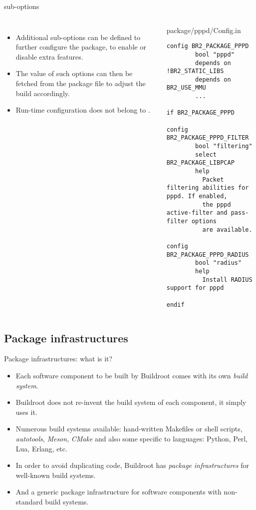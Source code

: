 \begin{frame}[fragile]{ sub-options}
  \begin{columns}
    \begin{itemize}
    \item Additional sub-options can be defined to further configure
      the package, to enable or disable extra features.
    \item The value of such options can then be fetched from the package
       file to adjust the build accordingly.
    \item Run-time configuration does not belong to .
    \end{itemize}
    \begin{block}{package/pppd/Config.in}
      \tiny
\begin{verbatim}
config BR2_PACKAGE_PPPD
        bool "pppd"
        depends on !BR2_STATIC_LIBS
        depends on BR2_USE_MMU
        ...

if BR2_PACKAGE_PPPD

config BR2_PACKAGE_PPPD_FILTER
        bool "filtering"
        select BR2_PACKAGE_LIBPCAP
        help
          Packet filtering abilities for pppd. If enabled,
          the pppd active-filter and pass-filter options
          are available.

config BR2_PACKAGE_PPPD_RADIUS
        bool "radius"
        help
          Install RADIUS support for pppd

endif
\end{verbatim}
    \end{block}
  \end{columns}
\end{frame}

\subsection{Package infrastructures}

\begin{frame}{Package infrastructures: what is it?}
  \begin{itemize}
  \item Each software component to be built by Buildroot comes with
    its own {\em build system}.
  \item Buildroot does not re-invent the build system of each
    component, it simply uses it.
  \item Numerous build systems available: hand-written Makefiles or
    shell scripts, {\em autotools}, {\em Meson}, {\em CMake} and also
    some specific to languages: Python, Perl, Lua, Erlang, etc.
  \item In order to avoid duplicating code, Buildroot has {\em package
      infrastructures} for well-known build systems.
  \item And a generic package infrastructure for software components
    with non-standard build systems.
  \end{itemize}
\end{frame}

